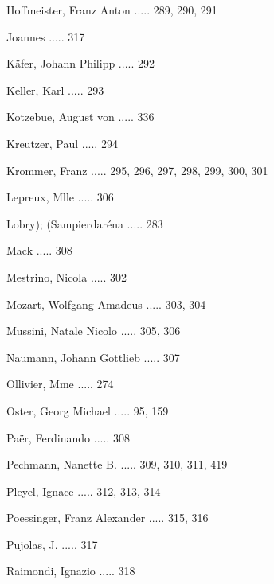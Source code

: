 \documentclass[twocolumn]{book}
\begin{document}
\newline 
Hoffmeister, Franz Anton ..... 289, 290, 291

\newline 
Joannes ..... 317

\newline 
Käfer, Johann Philipp ..... 292

\newline 
Keller, Karl ..... 293

\newline 
Kotzebue, August von ..... 336

\newline 
Kreutzer, Paul ..... 294

\newline 
Krommer, Franz ..... 295, 296, 297, 298, 299, 300, 301

\newline 
Lepreux, Mlle ..... 306

\newline 
Lobry); (Sampierdaréna ..... 283

\newline 
Mack ..... 308

\newline 
Mestrino, Nicola ..... 302

\newline 
Mozart, Wolfgang Amadeus ..... 303, 304

\newline 
Mussini, Natale Nicolo ..... 305, 306

\newline 
Naumann, Johann Gottlieb ..... 307

\newline 
Ollivier, Mme ..... 274

\newline 
Oster, Georg Michael ..... 95, 159

\newline 
Paër, Ferdinando ..... 308

\newline 
Pechmann, Nanette B. ..... 309, 310, 311, 419

\newline 
Pleyel, Ignace ..... 312, 313, 314

\newline 
Poessinger, Franz Alexander ..... 315, 316

\newline 
Pujolas, J. ..... 317

\newline 
Raimondi, Ignazio ..... 318
\end{document}
